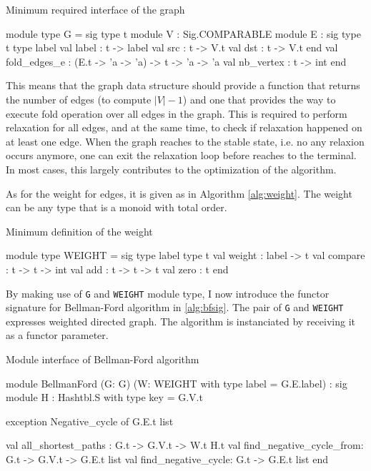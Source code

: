 \documentclass[a4paper,12pt]{article}
\begin{document}
\begin{algorithm}
\caption{Minimum required interface of the graph}\label{alg:graph}
\begin{ocaml}
module type G = sig
  type t
  module V : Sig.COMPARABLE
  module E : sig
    type t
    type label
    val label : t -> label
    val src : t -> V.t
    val dst : t -> V.t
  end
  val fold_edges_e : (E.t -> 'a -> 'a) -> t -> 'a -> 'a
  val nb_vertex : t -> int
end
\end{ocaml}
\end{algorithm}

This means that the graph data structure should provide a function
that returns the number of edges (to compute $|V|-1$) and one that
provides the way to execute fold operation over all edges in the
graph. This is required to perform relaxation for all edges, and at
the same time, to check if relaxation happened on at least one
edge. When the graph reaches to the stable state, i.e. no any relaxion
occurs anymore, one can exit the relaxation loop before reaches to the
terminal. In most cases, this largely contributes to the optimization
of the algorithm.

As for the weight for edges, it is given as in Algorithm
\ref{alg:weight}. The weight can be any type that is a monoid with
total order.

\begin{algorithm}
\caption{Minimum definition of the weight}\label{alg:weight}
\begin{ocaml}
module type WEIGHT = sig
  type label
  type t
  val weight : label -> t
  val compare : t -> t -> int
  val add : t -> t -> t
  val zero : t
end
\end{ocaml}
\end{algorithm}

By making use of \texttt{G} and \texttt{WEIGHT} module type, I now
introduce the functor signature for Bellman-Ford algorithm in
\ref{alg:bfsig}. The pair of \texttt{G} and \texttt{WEIGHT} expresses
weighted directed graph. The algorithm is instanciated by receiving it
as a functor parameter.

\begin{algorithm}
\caption{Module interface of Bellman-Ford algorithm}\label{alg:bfsig}
\begin{ocaml}
module BellmanFord
  (G: G)
  (W: WEIGHT with type label = G.E.label) :
sig
  module H : Hashtbl.S with type key = G.V.t

  exception Negative_cycle of G.E.t list

  val all_shortest_paths : G.t -> G.V.t -> W.t H.t
  val find_negative_cycle_from: G.t -> G.V.t -> G.E.t list
  val find_negative_cycle: G.t -> G.E.t list
end
\end{ocaml}
\end{algorithm}
\end{document}
